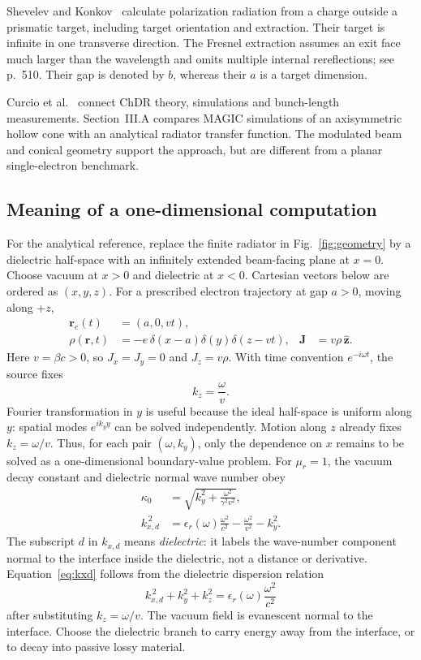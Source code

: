 \documentclass[11pt,a4paper]{article}
\numberwithin{equation}{section}
\begin{document}
Shevelev and Konkov~\cite{shevelev2014dielectrictarget} calculate polarization
radiation from a charge outside a prismatic target, including target
orientation and extraction. Their target is infinite in one transverse
direction. The Fresnel extraction assumes an exit face much larger than
the wavelength and omits multiple internal rereflections; see p.~510.
Their gap is denoted by \(b\), whereas their \(a\) is a target dimension.

Curcio et al.~\cite{curcio2020bunchlength} connect ChDR theory, simulations
and bunch-length measurements. Section~III.A compares MAGIC simulations of
an axisymmetric hollow cone with an analytical radiator transfer function.
The modulated beam and conical geometry support the approach, but are
different from a planar single-electron benchmark.

\subsection{Meaning of a one-dimensional computation}

For the analytical reference, replace the finite radiator in
Fig.~\ref{fig:geometry} by a dielectric half-space with an infinitely extended
beam-facing plane at \(x=0\). Choose vacuum at \(x>0\) and dielectric at
\(x<0\). Cartesian vectors below are ordered as \((x,y,z)\). For a prescribed
electron trajectory at gap \(a>0\), moving along \(+z\),
\begin{align}
 \mathbf r_e(t)&=(a,0,vt), \label{eq:trajectory}\\
 \rho(\mathbf r,t)&=-e\,\delta(x-a)\delta(y)\delta(z-vt),&
 \mathbf J&=v\rho\,\hat{\mathbf z}. \label{eq:source}
\end{align}
Here \(v=\beta c>0\), so \(J_x=J_y=0\) and \(J_z=v\rho\).
With time convention \(e^{-i\omega t}\), the source fixes
\begin{equation}
 k_z=\frac{\omega}{v}.
 \label{eq:phase}
\end{equation}
Fourier transformation in \(y\) is useful because the ideal half-space is
uniform along \(y\): spatial modes \(e^{ik_y y}\) can be solved independently.
Motion along \(z\) already fixes \(k_z=\omega/v\). Thus, for each pair
\((\omega,k_y)\), only the dependence on \(x\) remains to be solved as a
one-dimensional boundary-value problem. For \(\mu_r=1\), the vacuum decay
constant and dielectric normal wave number obey
\begin{align}
 \kappa_0&=\sqrt{k_y^2+\frac{\omega^2}{\gamma^2v^2}}, \label{eq:kappa}\\
 k_{x,d}^{\,2}&=\epsilon_r(\omega)\frac{\omega^2}{c^2}
                  -\frac{\omega^2}{v^2}-k_y^2. \label{eq:kxd}
\end{align}
The subscript \(d\) in \(k_{x,d}\) means \emph{dielectric}: it labels the
wave-number component normal to the interface inside the dielectric,
not a distance or derivative. Equation~\eqref{eq:kxd} follows from the
dielectric dispersion relation
\[
 k_{x,d}^{\,2}+k_y^2+k_z^2
 =\epsilon_r(\omega)\frac{\omega^2}{c^2}
\]
after substituting \(k_z=\omega/v\).
The vacuum field is evanescent normal to the interface. Choose the
dielectric branch to carry energy away from the interface, or to decay
into passive lossy material.
\end{document}

